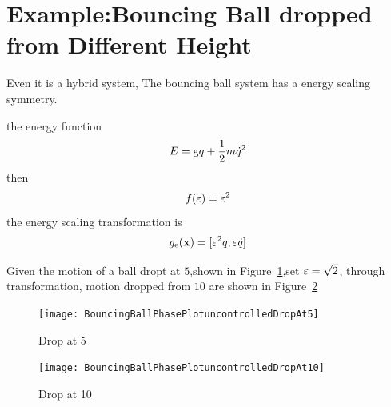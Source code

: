 \section{Example:Bouncing Ball dropped from Different Height}
\label{sec:symball}
Even it is a hybrid system,
The bouncing ball system has a energy scaling symmetry.

the energy function 
\[
E=\mathrm{g}q+\frac{1}{2}m\dot{q}^2
\]
then
\[
f(\varepsilon)=\varepsilon^2
\]
the energy scaling transformation is
\[
g_{\mathrm{e}}(\mathbf{x})=[\varepsilon^2 q, \varepsilon \dot{q}]
\]

Given the motion of a ball dropt at $5$,shown in Figure~\ref{fig:bouncing5},set $\varepsilon=\sqrt{2}$, through transformation, motion dropped from $10$ are shown in Figure~\ref{fig:bouncing10}
\begin{figure}[!htbp]
  \begin{center}
      \texttt{[image: BouncingBallPhasePlotuncontrolledDropAt5]}
    \caption{Drop at 5}
    \label{fig:bouncing5}
\end{center}
\end{figure}


\begin{figure}[!htbp]
  \begin{center}
      \texttt{[image: BouncingBallPhasePlotuncontrolledDropAt10]}
    \caption{Drop at 10}
    \label{fig:bouncing10}
\end{center}
\end{figure}




